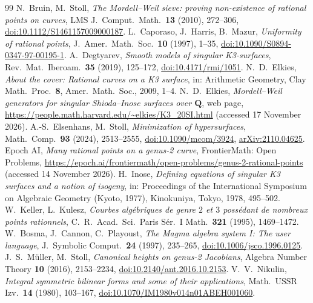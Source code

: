 \documentclass[11pt]{article}
\newcommand{\Q}{\mathbf{Q}}
\theoremstyle{remark}
\begin{document}
\begin{thebibliography}{99}\small\itemsep 0pt
 N.~Bruin, M.~Stoll, \emph{The Mordell--Weil sieve: proving non-existence of rational points on curves}, LMS J.\ Comput.\ Math.\ \textbf{13} (2010), 272--306, \href{https://doi.org/10.1112/S1461157009000187}{doi:10.1112/S1461157009000187}.
 L.~Caporaso, J.~Harris, B.~Mazur, \emph{Uniformity of rational points}, J.~Amer.\ Math.\ Soc.\ \textbf{10} (1997), 1--35, \href{https://doi.org/10.1090/S0894-0347-97-00195-1}{doi:10.1090/S0894-0347-97-00195-1}.
 A.~Degtyarev, \emph{Smooth models of singular K3-surfaces}, Rev.\ Mat.\ Iberoam.\ \textbf{35} (2019), 125--172, \href{https://doi.org/10.4171/rmi/1051}{doi:10.4171/rmi/1051}.
 N.~D.~Elkies, \emph{About the cover: Rational curves on a K3 surface}, in: Arithmetic Geometry, Clay Math.\ Proc.\ \textbf{8}, Amer.\ Math.\ Soc., 2009, 1--4.
 N.~D.~Elkies, \emph{Mordell--Weil generators for singular Shioda--Inose surfaces over $\Q$}, web page, \url{https://people.math.harvard.edu/~elkies/K3_20SI.html} (accessed 17 November 2026).
 A.-S.~Elsenhans, M.~Stoll, \emph{Minimization of hypersurfaces}, Math.\ Comp.\ \textbf{93} (2024), 2513--2555, \href{https://doi.org/10.1090/mcom/3924}{doi:10.1090/mcom/3924}, \href{https://arxiv.org/abs/2110.04625}{arXiv:2110.04625}.
 Epoch AI, \emph{Many rational points on a genus-2 curve}, FrontierMath: Open Problems, \url{https://epoch.ai/frontiermath/open-problems/genus-2-rational-points} (accessed 14 November 2026).
 H.~Inose, \emph{Defining equations of singular K3 surfaces and a notion of isogeny}, in: Proceedings of the International Symposium on Algebraic Geometry (Kyoto, 1977), Kinokuniya, Tokyo, 1978, 495--502.
 W.~Keller, L.~Kulesz, \emph{Courbes alg\'ebriques de genre $2$ et $3$ poss\'edant de nombreux points rationnels}, C.~R.\ Acad.\ Sci.\ Paris S\'er.~I Math.\ \textbf{321} (1995), 1469--1472.
 W.~Bosma, J.~Cannon, C.~Playoust, \emph{The Magma algebra system I: The user language}, J.~Symbolic Comput.\ \textbf{24} (1997), 235--265, \href{https://doi.org/10.1006/jsco.1996.0125}{doi:10.1006/jsco.1996.0125}.
 J.~S.~M\"uller, M.~Stoll, \emph{Canonical heights on genus-2 Jacobians}, Algebra Number Theory \textbf{10} (2016), 2153--2234, \href{https://doi.org/10.2140/ant.2016.10.2153}{doi:10.2140/ant.2016.10.2153}.
 V.~V.~Nikulin, \emph{Integral symmetric bilinear forms and some of their applications}, Math.\ USSR Izv.\ \textbf{14} (1980), 103--167, \href{https://doi.org/10.1070/IM1980v014n01ABEH001060}{doi:10.1070/IM1980v014n01ABEH001060}.

\end{thebibliography}
\end{document}
